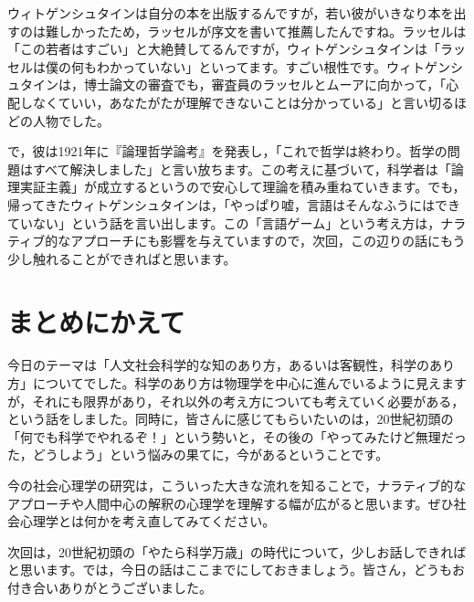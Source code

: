 \documentclass{ltjsbook}
\begin{document}
ウィトゲンシュタインは自分の本を出版するんですが，若い彼がいきなり本を出すのは難しかったため，ラッセルが序文を書いて推薦したんですね。ラッセルは「この若者はすごい」と大絶賛してるんですが，ウィトゲンシュタインは「ラッセルは僕の何もわかっていない」といってます。すごい根性です。ウィトゲンシュタインは，博士論文の審査でも，審査員のラッセルとムーアに向かって，「心配しなくていい，あなたがたが理解できないことは分かっている」と言い切るほどの人物でした。

で，彼は1921年に『論理哲学論考』を発表し，「これで哲学は終わり。哲学の問題はすべて解決しました」と言い放ちます。この考えに基づいて，科学者は「論理実証主義」が成立するというので安心して理論を積み重ねていきます。でも，帰ってきたウィトゲンシュタインは，「やっぱり嘘，言語はそんなふうにはできていない」という話を言い出します。この「言語ゲーム」という考え方は，ナラティブ的なアプローチにも影響を与えていますので，次回，この辺りの話にもう少し触れることができればと思います。

\section{まとめにかえて}

今日のテーマは「人文社会科学的な知のあり方，あるいは客観性，科学のあり方」についてでした。科学のあり方は物理学を中心に進んでいるように見えますが，それにも限界があり，それ以外の考え方についても考えていく必要がある，という話をしました。同時に，皆さんに感じてもらいたいのは，20世紀初頭の「何でも科学でやれるぞ！」という勢いと，その後の「やってみたけど無理だった，どうしよう」という悩みの果てに，今があるということです。

今の社会心理学の研究は，こういった大きな流れを知ることで，ナラティブ的なアプローチや人間中心の解釈の心理学を理解する幅が広がると思います。ぜひ社会心理学とは何かを考え直してみてください。

次回は，20世紀初頭の「やたら科学万歳」の時代について，少しお話しできればと思います。では，今日の話はここまでにしておきましょう。皆さん，どうもお付き合いありがとうございました。
\printbibliography[title=引用文献]
\end{document}
